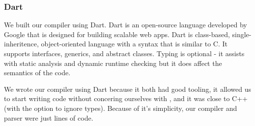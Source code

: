 
\subsubsection{Dart}
We built our compiler using Dart\cite{dartlang}.
Dart is an open-source language developed by Google that is
designed for building scalable web apps. Dart is class-based,
single-inheritence,
object-oriented language with a syntax that is similar to C. It supports
interfaces, generics, and abstract classes. Typing is optional - it assists
with static analysis and dynamic runtime checking but it does affect the
semantics of the code.

We wrote our compiler using Dart because it both had good tooling, it allowed
	us to start writing code without concering ourselves with ,
	and it was close to C++ (with the option to ignore types).
Because of it's simplicity, our compiler and parser were just  lines of code.